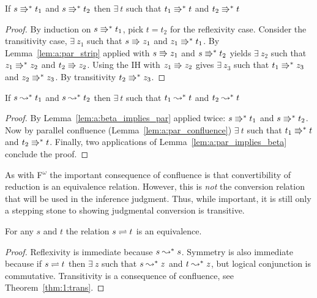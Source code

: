 \begin{lemma}
    \label{lem:a:par_confluence}
    If $s \Rrightarrow^* t_1$ and $s \Rrightarrow^* t_2$ then $\exists\ t$ such that $t_1 \Rrightarrow^* t$ and $t_2 \Rrightarrow^* t$
\end{lemma}
\begin{proof}
    By induction on $s \Rrightarrow^* t_1$, pick $t = t_2$ for the reflexivity case.
    Consider the transitivity case, $\exists\ z_1$ such that $s \Rrightarrow z_1$ and $z_1 \Rrightarrow^* t_1$.
    By Lemma~\ref{lem:a:par_strip} applied with $s \Rrightarrow z_1$ and $s \Rrightarrow^* t_2$ yields $\exists\ z_2$ such that $z_1 \Rrightarrow^* z_2$ and $t_2 \Rrightarrow z_2$.
    Using the IH with $z_1 \Rrightarrow z_2$ gives $\exists\ z_3$ such that $t_1 \Rrightarrow^* z_3$ and $z_2 \Rrightarrow^* z_3$.
    By transitivity $t_2 \Rrightarrow^* z_3$.
\end{proof}

\begin{lemma}[Confluence]
    \label{lem:2:confluence}
    If $s \leadsto^* t_1$ and $s \leadsto^* t_2$ then $\exists\ t$ such that $t_1 \leadsto^* t$ and $t_2 \leadsto^* t$
\end{lemma}
\begin{proof}
    By Lemma~\ref{lem:a:beta_implies_par} applied twice: $s \Rrightarrow^* t_1$ and $s \Rrightarrow^* t_2$.
    Now by parallel confluence (Lemma~\ref{lem:a:par_confluence}) $\exists\ t$ such that $t_1 \Rrightarrow^* t$ and $t_2 \Rrightarrow^* t$.
    Finally, two applications of Lemma~\ref{lem:a:par_implies_beta} conclude the proof.
\end{proof}

As with F$^\omega$ the important consequence of confluence is that convertibility of reduction is an equivalence relation.
However, this is \textit{not} the conversion relation that will be used in the inference judgment.
Thus, while important, it is still only a stepping stone to showing judgmental conversion is transitive.

\begin{theorem}
    \label{lem:2:beta_conv_equivalence}
    For any $s$ and $t$ the relation $s \rightleftharpoons t$ is an equivalence.
\end{theorem}
\begin{proof}
    Reflexivity is immediate because $s \leadsto^* s$.
    Symmetry is also immediate because if $s \rightleftharpoons t$ then $\exists\ z$ such that $s \leadsto^* z$ and $t \leadsto^* z$, but logical conjunction is commutative.
    Transitivity is a consequence of confluence, see Theorem~\ref{thm:1:trans}.
\end{proof}

